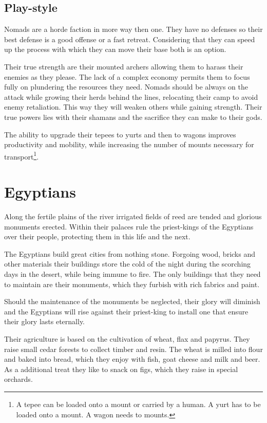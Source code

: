 \documentclass[a4paper]{book}
\begin{document}
	\subsection{Play-style}
		\Gls{Nomads} are a horde faction in more way then one.
		They have no defenses so their best defense is a good offense or a fast retreat.
		Considering that they can speed up the process with which they can move
		their base both is an option.

		Their true strength are their mounted archers allowing them to harass their enemies
		as they please.
		The lack of a complex economy permits them to focus fully on plundering
		the resources they need.
		\Gls{Nomads} should be always on the attack while growing their herds behind the lines,
		relocating their camp to avoid enemy retaliation.
		This way they will weaken others while gaining strength.
		Their true powers lies with their shamans and the sacrifice they can make to their gods.

		The ability to upgrade their tepees to yurts and then to wagons improves productivity
		and mobility, while increasing the number of mounts necessary for transport\footnote{
			A tepee can be loaded onto a mount or carried by a human.
			A yurt has to be loaded onto a mount.
			A wagon needs to mounts.
		}.

\section{\Gls{Egyptians}}

	Along the fertile plains of the river irrigated fields of reed are tended
	and glorious monuments erected.
	Within their palaces rule the priest-kings of the \gls{Egyptians} over their
	people, protecting them in this life and the next.

	The \gls{Egyptians} build great cities from nothing stone.
	Forgoing wood, bricks and other materials their buildings store the cold
	of the night during the scorching days in the desert,
	while being immune to fire.
	The only buildings that they need to maintain are their monuments,
	which they furbish with rich fabrics and paint.

	Should the maintenance of the monuments be neglected,
	their glory will diminish and the \gls{Egyptians} will rise against their
	priest-king to install one that ensure their glory lasts eternally.

	Their agriculture is based on the cultivation of wheat, flax and papyrus.
	They raise small cedar forests to collect timber and resin.
	The wheat is milled into flour and baked into bread,
		which they enjoy with fish, goat cheese and milk and beer.
	As a additional treat they like to snack on figs,
	which they raise in special orchards.
\end{document}
